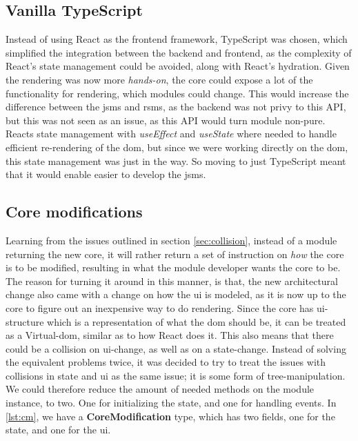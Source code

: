 \subsection{Vanilla TypeScript}

Instead of using React as the frontend framework, TypeScript was chosen, which
simplified the integration between the backend and frontend, as the complexity
of React's state management could be avoided, along with React's hydration.
Given the rendering was now more \textit{hands-on}, the core could expose a lot
of the functionality for rendering, which modules could change. This would
increase the difference between the \gls*{jsms} and \gls*{rsms}, as the backend
was not privy to this API, but this was not seen as an issue, as this API would
turn module non-pure. Reacts state management with \textit{useEffect} and
\textit{useState} where needed to handle efficient re-rendering of the
\gls{dom}, but since we were working directly on the \gls{dom}, this state
management was just in the way. So moving to just TypeScript meant that it would
enable easier to develop the \gls*{jsms}.


\subsection{Core modifications}

Learning from the issues outlined in section \ref{sec:collision}, instead of a
module returning the new core, it will rather return a set of instruction on
\textit{how} the core is to be modified, resulting in what the module developer
wants the core to be. The reason for turning it around in this manner, is that,
the new architectural change also came with a change on how the \gls*{ui} is
modeled, as it is now up to the core to figure out an inexpensive way to do
rendering. Since the core has \gls*{ui}-structure which is a representation of
what the \gls*{dom} should be, it can be treated as a Virtual-\gls*{dom}, similar
as to how React does it. This also means that there could be a collision on
\gls*{ui}-change, as well as on a state-change. Instead of solving the equivalent
problems twice, it was decided to try to treat the issues with collisions in
state and \gls*{ui} as the same issue; it is some form of tree-manipulation. We
could therefore reduce the amount of needed methods on the module instance, to
two. One for initializing the state, and one for handling events. In
\ref{lst:cm}, we have a \textbf{CoreModification} type, which has two fields,
one for the state, and one for the \gls*{ui}.

